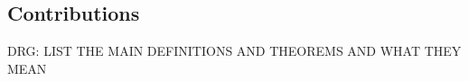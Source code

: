 \documentclass[]{IEEEtran}
\begin{document}
\subsection{Contributions}

DRG: LIST THE MAIN DEFINITIONS AND THEOREMS AND WHAT THEY MEAN










\appendix


\end{document}
